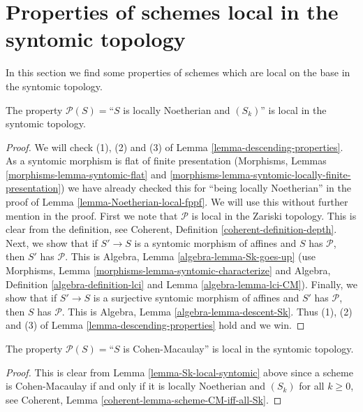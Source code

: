 \section{Properties of schemes local in the syntomic topology}
\label{section-descending-properties-syntomic}

\noindent
In this section we find some properties of schemes which are local on the base
in the syntomic topology.

\begin{lemma}
\label{lemma-Sk-local-syntomic}
The property $\mathcal{P}(S) =$``$S$ is locally Noetherian and $(S_k)$''
is local in the syntomic topology.
\end{lemma}

\begin{proof}
We will check (1), (2) and (3) of Lemma \ref{lemma-descending-properties}.
As a syntomic morphism is flat of finite presentation
(Morphisms, Lemmas \ref{morphisms-lemma-syntomic-flat}
and \ref{morphisms-lemma-syntomic-locally-finite-presentation})
we have already checked this for ``being locally Noetherian'' in the proof
of Lemma \ref{lemma-Noetherian-local-fppf}.
We will use this without further mention in the proof.
First we note that $\mathcal{P}$ is local in the Zariski topology.
This is clear from the definition,
see Coherent, Definition \ref{coherent-definition-depth}.
Next, we show that if $S' \to S$ is a syntomic morphism of affines
and $S$ has $\mathcal{P}$, then $S'$ has $\mathcal{P}$. This
is Algebra, Lemma \ref{algebra-lemma-Sk-goes-up}
(use
Morphisms, Lemma \ref{morphisms-lemma-syntomic-characterize}
and
Algebra, Definition \ref{algebra-definition-lci} and
Lemma \ref{algebra-lemma-lci-CM}).
Finally, we show that if $S' \to S$ is a surjective
syntomic morphism of affines and $S'$ has $\mathcal{P}$,
then $S$ has $\mathcal{P}$. This is
Algebra, Lemma \ref{algebra-lemma-descent-Sk}.
Thus (1), (2) and (3) of Lemma \ref{lemma-descending-properties} hold
and we win.
\end{proof}

\begin{lemma}
\label{lemma-CM-local-syntomic}
The property $\mathcal{P}(S) =$``$S$ is Cohen-Macaulay''
is local in the syntomic topology.
\end{lemma}

\begin{proof}
This is clear from Lemma \ref{lemma-Sk-local-syntomic}
above since a scheme is Cohen-Macaulay if and only if
it is locally Noetherian and $(S_k)$ for all $k \geq 0$, see
Coherent, Lemma \ref{coherent-lemma-scheme-CM-iff-all-Sk}.
\end{proof}







